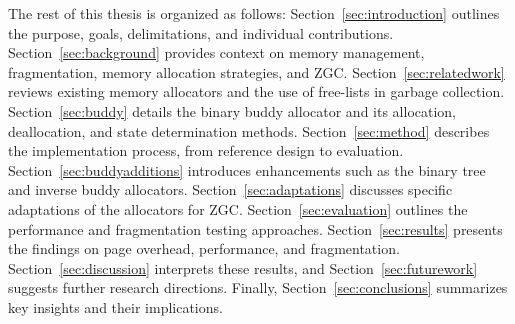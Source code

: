The rest of this thesis is organized as follows: Section~\ref{sec:introduction} outlines the purpose, goals, delimitations, and individual contributions. Section~\ref{sec:background} provides context on memory management, fragmentation, memory allocation strategies, and ZGC. Section~\ref{sec:relatedwork} reviews existing memory allocators and the use of free-lists in garbage collection. Section~\ref{sec:buddy} details the binary buddy allocator and its allocation, deallocation, and state determination methods. Section~\ref{sec:method} describes the implementation process, from reference design to evaluation. Section~\ref{sec:buddyadditions} introduces enhancements such as the binary tree and inverse buddy allocators. Section~\ref{sec:adaptations} discusses specific adaptations of the allocators for ZGC. Section~\ref{sec:evaluation} outlines the performance and fragmentation testing approaches. Section~\ref{sec:results} presents the findings on page overhead, performance, and fragmentation. Section~\ref{sec:discussion} interprets these results, and Section~\ref{sec:futurework} suggests further research directions. Finally, Section~\ref{sec:conclusions} summarizes key insights and their implications.